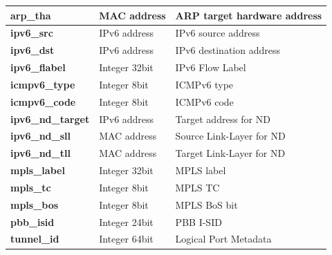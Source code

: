 \documentclass[12pt, oneside]{book}
\begin{document}
\begin{longtable}{|l|l|l|}
	\textbf{arp\_tha}         & MAC address    & ARP target hardware address                                                                            \\ \hline
	\textbf{ipv6\_src}        & IPv6 address   & IPv6 source address                                                                                    \\ \hline
	\textbf{ipv6\_dst}        & IPv6 address   & IPv6 destination address                                                                               \\ \hline
	\textbf{ipv6\_flabel}     & Integer 32bit  & IPv6 Flow Label                                                                                        \\ \hline
	\textbf{icmpv6\_type}     & Integer 8bit   & ICMPv6 type                                                                                            \\ \hline
	\textbf{icmpv6\_code}     & Integer 8bit   & ICMPv6 code                                                                                            \\ \hline
	\textbf{ipv6\_nd\_target} & IPv6 address   & Target address for ND                                                                                  \\ \hline
	\textbf{ipv6\_nd\_sll}    & MAC address    & Source Link-Layer for ND                                                                               \\ \hline
	\textbf{ipv6\_nd\_tll}    & MAC address    & Target Link-Layer for ND                                                                               \\ \hline
	\textbf{mpls\_label}      & Integer 32bit  & MPLS label                                                                                             \\ \hline
	\textbf{mpls\_tc}         & Integer 8bit   & MPLS TC                                                                                                \\ \hline
	\textbf{mpls\_bos}        & Integer 8bit   & MPLS BoS bit                                                                                           \\ \hline
	\textbf{pbb\_isid}        & Integer 24bit  & PBB I-SID                                                                                              \\ \hline
	\textbf{tunnel\_id}       & Integer 64bit  & Logical Port Metadata                                                                                  \\ \hline

\end{longtable}
\end{document}
